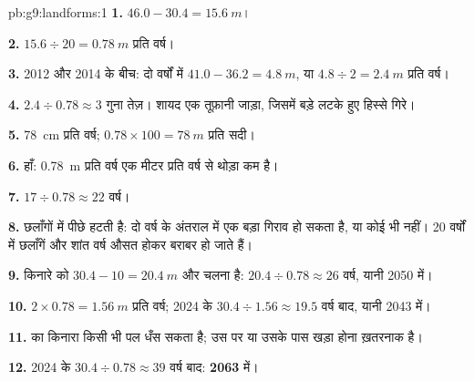 \begin{solution}{pb:g9:landforms:1}
\textbf{1.} $46.0 - 30.4 = \qty{15.6}{m}$।

\textbf{2.} $15.6 \div 20 = \qty{0.78}{m}$ प्रति वर्ष।

\textbf{3.} 2012 और 2014 के बीच: दो वर्षों में $41.0 - 36.2 = \qty{4.8}{m}$,
या $4.8 \div 2 = \qty{2.4}{m}$ प्रति वर्ष।

\textbf{4.} $2.4 \div 0.78 \approx 3$ गुना तेज़। शायद एक तूफ़ानी जाड़ा, जिसमें
बड़े लटके हुए हिस्से गिरे।

\textbf{5.} \qty{78}{cm} प्रति वर्ष; $0.78 \times 100 = \qty{78}{m}$ प्रति
सदी।

\textbf{6.} हाँ: \qty{0.78}{m} प्रति वर्ष एक मीटर प्रति वर्ष से थोड़ा कम है।

\textbf{7.} $17 \div 0.78 \approx 22$ वर्ष।

\textbf{8.}  छलाँगों में पीछे हटती है: दो वर्ष के अंतराल में एक बड़ा गिराव हो सकता है,
या कोई भी नहीं। 20 वर्षों में छलाँगें और शांत वर्ष औसत होकर बराबर हो
जाते हैं।

\textbf{9.} किनारे को $30.4 - 10 = \qty{20.4}{m}$ और चलना है: $20.4 \div 0.78
\approx 26$ वर्ष, यानी 2050 में।

\textbf{10.} $2 \times 0.78 = \qty{1.56}{m}$ प्रति वर्ष; 2024 के $30.4 \div 1.56
\approx 19.5$ वर्ष बाद, यानी 2043 में।

\textbf{11.}  का किनारा किसी भी पल धँस सकता है; उस पर या उसके पास खड़ा होना
ख़तरनाक है।

\textbf{12.} 2024 के $30.4 \div 0.78 \approx 39$ वर्ष बाद:
\textbf{2063} में।
\end{solution}
